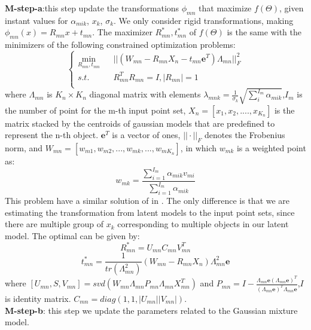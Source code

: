 \textbf{M-step-a}:this step update the transformations $\phi_{mn}$ that maximize $f(\Theta)$, given instant values for $\alpha_{mik}$, $x_k$, $\sigma_k$. We only consider rigid transformations, making  $\phi_{mn}(x)=R_{mn}x+t_{mn}$. The maximizer $R_{mn}^*,t_{mn}^*$  of $f(\Theta)$ is the same with the minimizers of the following constrained optimization problems:\\
\begin{equation}
\left\{
\begin{array}{rcl}
\min_{R_{mn},t_{mn}}&      &||(W_{mn}-R_{mn}X_n-t_{mn}\mathbf{e}^T)\Lambda_{mn}||_F^2\\
s.t.&      &R_{mn}^TR_{mn}=I, |R_{mn}|=1\\
\end{array} \right.
\end{equation}
where $\Lambda_{mn}$ is $K_n \times K_n$ diagonal matrix with elements $\lambda_{mnk}=\frac{1}{\sigma_k}\sqrt{\sum_i^{I_{m}}\alpha_{mik}}$,$I_m$ is the number of point for the m-th input point set, $X_n = [x_1,x_2,....,x_{K_n}]$ is the matrix stacked by the centroids of gaussian models that are predefined to represent the n-th object. $\mathbf{e}^T$ is a vector of ones, $||\cdot||_F$ denotes the Frobenius norm, and $W_{mn}=[w_{m1},w_{m2},...,w_{mk},...,w_{mK_n}]$, in which $w_{mk}$ is a weighted point as:\\
\begin{equation}
w_{mk}=\frac{\sum_{i=1}^{I_m}\alpha_{mik}v_{mi}}{\sum_{i=1}^{I_m}\alpha_{mik}}
\end{equation}
This problem have a similar solution of in \cite{Evangelidis2014}. The only difference is that we are estimating the transformation from latent models to the input point sets, since there are multiple group of $x_k$ corresponding to multiple objects in our latent model. The optimal can be given by:\\
\begin{equation}
R_{mn}^*=U_{mn}C_{mn}V_{mn}^T
\end{equation}
\begin{equation}
t_{mn}^*=\frac{1}{tr(\Lambda_{mn}^2)}(W_{mn}-R_{mn}X_n)\Lambda_{mn}^2\mathbf{e}
\end{equation}
where $[U_{mn},S,V_{mn}]=svd( W_{mn}\Lambda_{mn}P_{mn}\Lambda_{mn}X_{mn}^T )$ and $P_{mn}=I-\frac{\Lambda_{mn}\mathbf{e}(\Lambda_{mn}\mathbf{e})^T}{(\Lambda_{mn}\mathbf{e})^T\Lambda_{mn}\mathbf{e}}$,$I$ is identity matrix. $C_{mn}=diag(1,1,|U_{mn}||V_{mn}|)$.\\
\textbf{M-step-b}: this step we update the parameters related to the Gaussian mixture model. 
